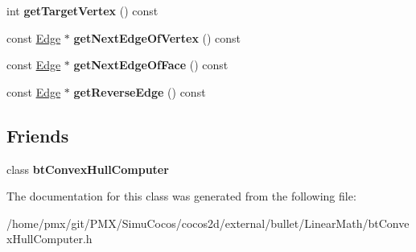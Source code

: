 \begin{DoxyCompactItemize}
int {\bfseries get\+Target\+Vertex} () const
\item 
\mbox{\label{classbtConvexHullComputer_1_1Edge_aa35c898e94e4dc5e4adf4cf91c3898ea}} 
const \hyperlink{classbtConvexHullComputer_1_1Edge}{Edge} $\ast$ {\bfseries get\+Next\+Edge\+Of\+Vertex} () const
\item 
\mbox{\label{classbtConvexHullComputer_1_1Edge_a5c140dbc46067408b152d9b9dc603b28}} 
const \hyperlink{classbtConvexHullComputer_1_1Edge}{Edge} $\ast$ {\bfseries get\+Next\+Edge\+Of\+Face} () const
\item 
\mbox{\label{classbtConvexHullComputer_1_1Edge_a8eacf89c7ffd78a17878241ecc59062e}} 
const \hyperlink{classbtConvexHullComputer_1_1Edge}{Edge} $\ast$ {\bfseries get\+Reverse\+Edge} () const
\end{DoxyCompactItemize}
\subsection*{Friends}
\begin{DoxyCompactItemize}
\item 
\mbox{\label{classbtConvexHullComputer_1_1Edge_aee48c64e3bb2482496a809cf678daca6}} 
class {\bfseries bt\+Convex\+Hull\+Computer}
\end{DoxyCompactItemize}


The documentation for this class was generated from the following file\+:\begin{DoxyCompactItemize}
\item 
/home/pmx/git/\+P\+M\+X/\+Simu\+Cocos/cocos2d/external/bullet/\+Linear\+Math/bt\+Convex\+Hull\+Computer.\+h\end{DoxyCompactItemize}
